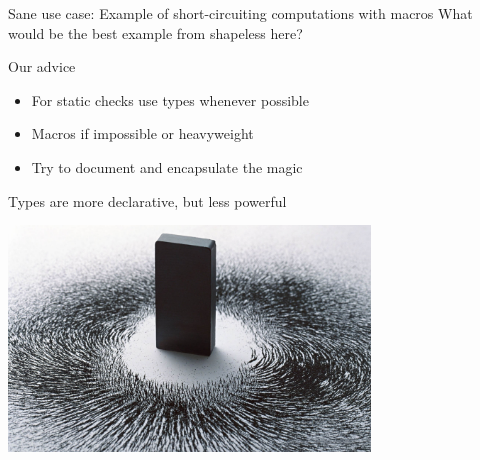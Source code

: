 \documentclass{beamer}
\begin{document}
\begin{frame}{Sane use case: Example of short-circuiting computations with macros}
  What would be the best example from shapeless here?
\end{frame}

\begin{frame}{Our advice}
  \begin{itemize}
  \item For static checks use types whenever possible
  \item Macros if impossible or heavyweight
  \item Try to document and encapsulate the magic
  \end{itemize}
\end{frame}

\begin{frame}
\vskip40pt
\begin{center}
\end{center}
\end{frame}

\begin{frame}
\vskip40pt
\begin{center}
\end{center}
\end{frame}

\begin{frame}[fragile]{Types are more declarative, but less powerful}
  \begin{center}
    \includegraphics[height=6cm]{img/magnet.jpg}
  \end{center}
\end{frame}
\end{document}
